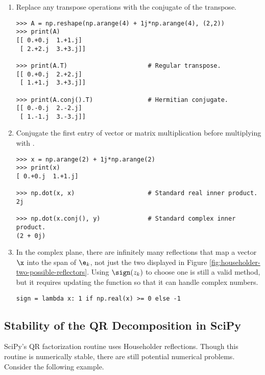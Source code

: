 \begin{enumerate}

\item Replace any transpose operations with the conjugate of the transpose.

\begin{lstlisting}
>>> A = np.reshape(np.arange(4) + 1j*np.arange(4), (2,2))
>>> print(A)
[[ 0.+0.j  1.+1.j]
 [ 2.+2.j  3.+3.j]]

>>> print(A.T)                      # Regular transpose.
[[ 0.+0.j  2.+2.j]
 [ 1.+1.j  3.+3.j]]

>>> print(A.conj().T)               # Hermitian conjugate.
[[ 0.-0.j  2.-2.j]
 [ 1.-1.j  3.-3.j]]
\end{lstlisting}

\item Conjugate the first entry of vector or matrix multiplication before multiplying with .

\begin{lstlisting}
>>> x = np.arange(2) + 1j*np.arange(2)
>>> print(x)
[ 0.+0.j  1.+1.j]

>>> np.dot(x, x)                    # Standard real inner product.
2j

>>> np.dot(x.conj(), y)             # Standard complex inner product.
(2 + 0j)
\end{lstlisting}

\item In the complex plane, there are infinitely many reflections that map a vector $\x$ into the span of $\e_k$, not just the two displayed in Figure \ref{fig:householder-two-possible-reflectors}.
Using $\sign(z_k)$ to choose one is still a valid method, but it requires updating the  function so that it can handle complex numbers.

\begin{lstlisting}
sign = lambda x: 1 if np.real(x) >= 0 else -1
\end{lstlisting}

\end{enumerate}

\subsection*{Stability of the QR Decomposition in SciPy} %

SciPy's QR factorization routine uses Householder reflections.
Though this routine is numerically stable, there are still potential numerical problems.
Consider the following example.

